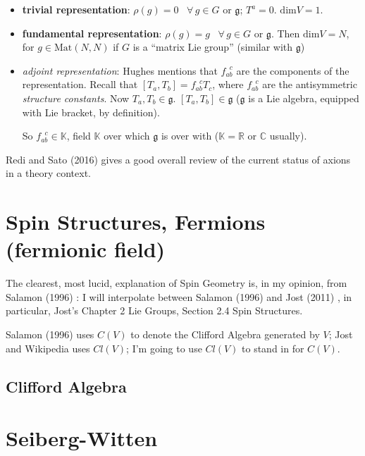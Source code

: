 \documentclass[10pt]{amsart}
\begin{document}
\begin{itemize}
  \item \textbf{trivial representation}: $\rho(g) =0$ \, $\forall \, g\in G$ or $\mathfrak{g}$; $T^a =0$.  $\text{dim}V=1$.  \item \textbf{fundamental representation}: $\rho(g) =g$ \, $\forall \, g\in G$ or $\mathfrak{g}$.  Then $\text{dim}V=N$,  for $g\in \text{Mat}(N,N)$ if $G$ is a ``matrix Lie group'' (similar with $\mathfrak{g}$)   
\item \emph{adjoint representation}: Hughes mentions that $f_{ab}^{ \; \; c}$ are the components of the representation.  Recall that $[T_a,T_b] = f_{ab}^{ \; \; c} T_c$, where $f_{ab}^{ \; \; c}$ are the antisymmetric \emph{structure constants}.  Now $T_a, T_b\in \mathfrak{g}$.  $[T_a,T_b]\in \mathfrak{g}$ ($\mathfrak{g}$ is a Lie algebra, equipped with Lie bracket, by definition).  

So $f_{ab}^{ \; \; c} \in \mathbb{K}$, field $\mathbb{K}$ over which $\mathfrak{g}$ is over with ($\mathbb{K} = \mathbb{R}$ or $\mathbb{C}$ usually).  


\end{itemize}




Redi and Sato (2016) \cite{RS1602} gives a good overall review of the current status of axions in a theory context.


\section{Spin Structures, Fermions (fermionic field) }

The clearest, most lucid, explanation of Spin Geometry is, in my opinion, from Salamon (1996) \cite{Sala1996}: I will interpolate between Salamon (1996) and Jost (2011) \cite{JJost2011}, in particular, Jost's Chapter 2 Lie Groups, Section 2.4 Spin Structures.  

Salamon (1996) \cite{Sala1996} uses $C(V)$ to denote the Clifford Algebra generated by $V$; Jost and Wikipedia uses $Cl(V)$; I'm going to use $Cl(V)$ to stand in for $C(V)$.  

\subsection{Clifford Algebra}


\section{Seiberg-Witten}
\end{document}
